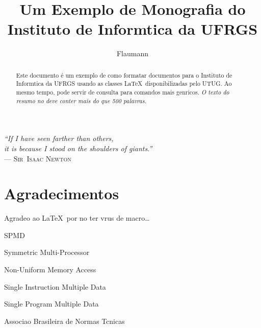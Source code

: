 \documentclass[diss]{template/setrem}
\title{Um Exemplo de Monografia do Instituto de Informtica da UFRGS}
\author{Flaumann}{Fritz Gutenberg}
\begin{document}
\maketitle

\clearpage
\begin{flushright}
\mbox{}\vfill
{\sffamily\itshape
``If I have seen farther than others,\\
it is because I stood on the shoulders of giants.''\\}
--- \textsc{Sir~Isaac Newton}
\end{flushright}

\chapter*{Agradecimentos}
Agradeo ao \LaTeX\ por no ter vrus de macro\ldots

\tableofcontents

\begin{listofabbrv}{SPMD}
        \item[SMP] Symmetric Multi-Processor
        \item[NUMA] Non-Uniform Memory Access
        \item[SIMD] Single Instruction Multiple Data
        \item[SPMD] Single Program Multiple Data
        \item[ABNT] Associao Brasileira de Normas Tcnicas
\end{listofabbrv}


\listoffigures


\begin{abstract}
Este documento é um exemplo de como formatar documentos para o
Instituto de Informtica da UFRGS usando as classes \LaTeX\
disponibilizadas pelo UTUG\@. Ao mesmo tempo, pode servir de consulta
para comandos mais genricos. \emph{O texto do resumo no deve
conter mais do que 500 palavras.}
\end{abstract}
\end{document}
